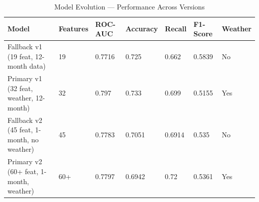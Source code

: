 \begin{table}[ht]
\centering
\caption{Model Evolution — Performance Across Versions}
\label{tab:models}
\begin{tabular}{lllllll}
\hline
Model & Features & ROC-AUC & Accuracy & Recall & F1-Score & Weather \\
\hline
Fallback v1 (19 feat, 12-month data) & 19 & 0.7716 & 0.725 & 0.662 & 0.5839 & No \\
Primary v1 (32 feat, weather, 12-month) & 32 & 0.797 & 0.733 & 0.699 & 0.5155 & Yes \\
Fallback v2 (45 feat, 1-month, no weather) & 45 & 0.7783 & 0.7051 & 0.6914 & 0.535 & No \\
Primary v2 (60+ feat, 1-month, weather) & 60+ & 0.7797 & 0.6942 & 0.72 & 0.5361 & Yes \\
\hline
\end{tabular}
\end{table}